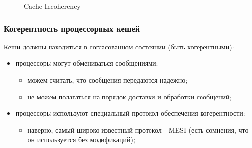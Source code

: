 \begin{frame}
\begin{figure}
  \caption{Cache Incoherency}
\end{figure}
\end{frame}

\begin{frame}
\frametitle{Когерентность процессорных кешей}

Кеши должны находиться в согласованном состоянии (быть когерентными):
\begin{itemize}
  \item процессоры могут обмениваться сообщениями:
        \begin{itemize}
          \item можем считать, что сообщения передаются надежно;
          \item не можем полагаться на порядок доставки и обработки сообщений;
        \end{itemize}
  \item процессоры используют специальный протокол обеспечения когерентности:
        \begin{itemize}
          \item наверно, самый широко известный протокол - MESI (есть сомнения,
                что он используется без модификаций);
        \end{itemize}
\end{itemize}
\end{frame}

